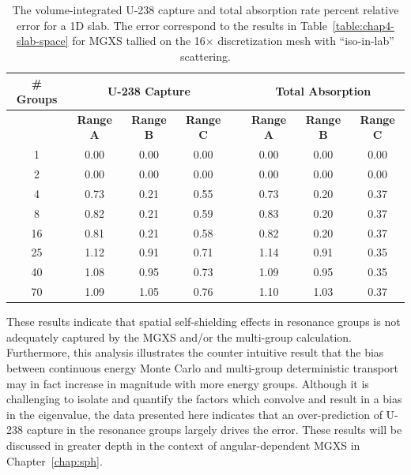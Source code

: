 \begin{table}[h!]
  \centering
  \caption[Reaction rate relative error for a 1D slab.]{The volume-integrated U-238 capture and total absorption rate percent relative error for a 1D slab. The error correspond to the results in Table~\ref{table:chap4-slab-space} for \ac{MGXS} tallied on the 16$\times$ discretization mesh with ``iso-in-lab'' scattering.}
  \small
  \label{table:chap4-slab-capture-errors} 
  \vspace{6pt}
  \begin{tabular}{c c c c c c c c}
  \toprule
  \multicolumn{1}{c}{\bf \# Groups} &
  \multicolumn{3}{c}{\bf U-238 Capture} &
  \multicolumn{1}{c}{} &
  \multicolumn{3}{c}{\bf Total Absorption} \\
  \midrule
  & \multicolumn{1}{c}{\bf Range A} &
  \multicolumn{1}{c}{\bf Range B} &
  \multicolumn{1}{c}{\bf Range C} &
  \multicolumn{1}{c}{} &
  \multicolumn{1}{c}{\bf Range A} &
  \multicolumn{1}{c}{\bf Range B} &
  \multicolumn{1}{c}{\bf Range C} \\
  \cline{2-4} \cline{6-8}
1 & 0.00 & 0.00 & 0.00 & & 0.00 & 0.00 & 0.00 \\
2 & 0.00 & 0.00 & 0.00 & & 0.00 & 0.00 & 0.00 \\
4 & 0.73 & 0.21 & 0.55 & & 0.73 & 0.20 & 0.37 \\
8 & 0.82 & 0.21 & 0.59 & & 0.83 & 0.20 & 0.37 \\
16 & 0.81 & 0.21 & 0.58 & & 0.82 & 0.20 & 0.37 \\
25 & 1.12 & 0.91 & 0.71 & & 1.14 & 0.91 & 0.35 \\
40 & 1.08 & 0.95 & 0.73 & & 1.09 & 0.95 & 0.35 \\
70 & 1.09 & 1.05 & 0.76 & & 1.10 & 1.03 & 0.37 \\
  \bottomrule
\end{tabular}
\end{table}

These results indicate that spatial self-shielding effects in resonance groups is not adequately captured by the \ac{MGXS} and/or the multi-group calculation. Furthermore, this analysis illustrates the counter intuitive result that the bias between continuous energy Monte Carlo and multi-group deterministic transport may in fact increase in magnitude with more energy groups. Although it is challenging to isolate and quantify the factors which convolve and result in a bias in the eigenvalue, the data presented here indicates that an over-prediction of U-238 capture in the resonance groups largely drives the error. These results will be discussed in greater depth in the context of angular-dependent \ac{MGXS} in Chapter~\ref{chap:sph}.


